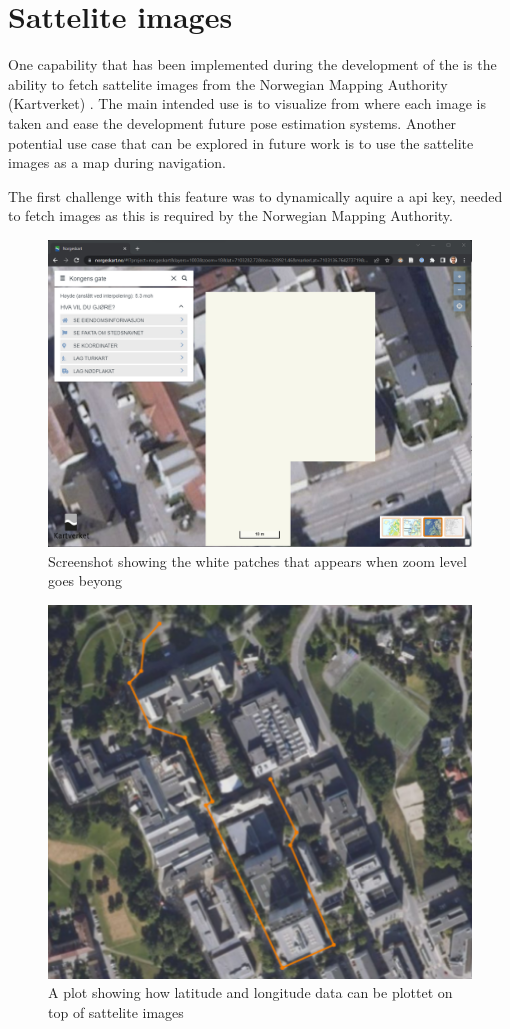 \section{Sattelite images}
One capability that has been implemented during the development of the \gui is the ability to fetch sattelite images from the Norwegian Mapping Authority (Kartverket) \cite{kartverketNorgeskart}.
The main intended use is to visualize from where each image is taken and ease the development future pose estimation systems.
Another potential use case that can be explored in future work is to use the sattelite images as a map during navigation.

The first challenge with this feature was to dynamically aquire a api key, needed to fetch images as this is required by the Norwegian Mapping Authority.


\begin{figure}[H]
    \centering
    \includegraphics[width=.6\textwidth]{figures/gui/norgeskart_bug.png}
    \caption{Screenshot showing the white patches that appears when zoom level goes beyong \todo \cite{kartverketNorgeskart}}
    \label{fig:norgeskart_bug}
\end{figure}
\begin{figure}[H]
    \centering
    \includegraphics[width=.6\textwidth]{figures/gui/sattelite_with_plot.png}
    \caption{A plot showing how latitude and longitude data can be plottet on top of sattelite images}
    \label{fig:dash_sattelite}
\end{figure}